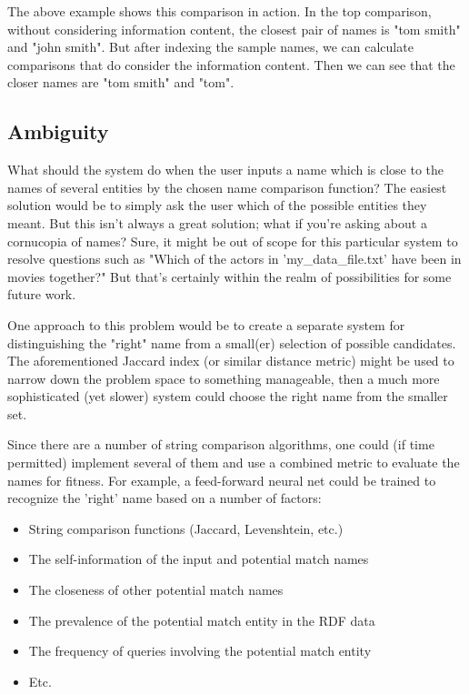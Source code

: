 \documentclass[11pt]{article}
\begin{document}
The above example shows this comparison in action. In the top comparison,
without considering information content, the closest pair of names is
"tom smith" and "john smith". But after indexing the sample names, we
can calculate comparisons that do consider the information content. Then
we can see that the closer names are "tom smith" and "tom".

\subsection{Ambiguity}
What should the system do when the user inputs a name which is close
to the names of several entities by the chosen name comparison
function? The easiest solution would be to simply ask the user which
of the possible entities they meant. But this isn't always a great
solution; what if you're asking about a cornucopia of names?
Sure, it might be out of scope for this particular system to
resolve questions such as "Which of the actors in 'my\_data\_file.txt'
have been in movies together?" But that's certainly within the
realm of possibilities for some future work.

One approach to this problem would be to create a separate
system for distinguishing the "right" name from a small(er) selection
of possible candidates. The aforementioned Jaccard index (or similar
distance metric) might be used to narrow down the problem space
to something manageable, then a much more sophisticated (yet slower)
system could choose the right name from the smaller set.

Since there are a number of string comparison algorithms, one could
(if time permitted) implement several of them and use a combined
metric to evaluate the names for fitness. For example,
a feed-forward neural net could be trained to recognize the 'right'
name based on a number of factors:
\begin{itemize}
\item String comparison functions (Jaccard, Levenshtein, etc.)
\item The self-information \cite{shannon} of the input and potential match names
\item The closeness of other potential match names
\item The prevalence of the potential match entity in the RDF data
\item The frequency of queries involving the potential match entity
\item Etc.
\end{itemize}
\end{document}
